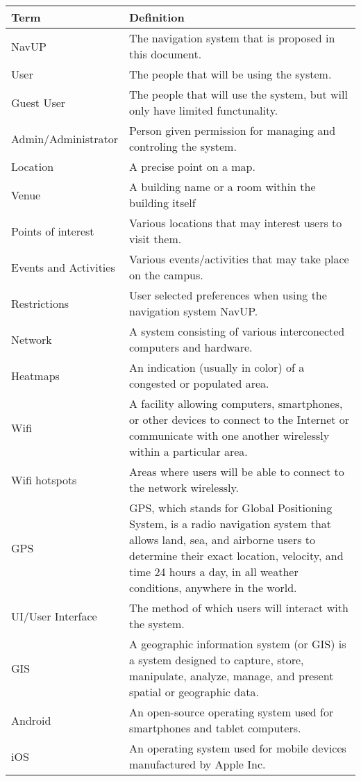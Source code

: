 \begin{center}
    \begin{tabular}{| l | p{8cm} |}
    \hline
    \textbf{Term} & \textbf{Definition} \\ \hline
	NavUP & The navigation system that is proposed in this document. \\ \hline
	User & The people that will be using the system. \\ \hline
	Guest User & The people that will use the system, but will only have limited functunality. \\ \hline
	Admin/Administrator & Person given permission for managing and controling the system. \\ \hline
	Location & A precise point on a map. \\ \hline
	Venue & A building name or a room within the building itself \\ \hline
	Points of interest & Various locations that may interest users to visit them. \\ \hline
	Events and Activities & Various events/activities that may take place on the campus. \\ \hline
	Restrictions & User selected preferences when using the navigation system NavUP. \\ \hline
	Network & A system consisting of various interconected computers and hardware. \\ \hline
	Heatmaps & An indication (usually in color) of a congested or populated area. \\ \hline
	Wifi & A facility allowing computers, smartphones, or other devices to connect to the Internet or communicate with one another wirelessly within a particular area. \\ \hline
	Wifi hotspots & Areas where users will be able to connect to the network wirelessly. \\ \hline    
	GPS & GPS, which stands for Global Positioning System, is a radio navigation system that allows land, sea, and airborne users to determine their exact location, velocity, and time 24 hours a day, in all weather conditions, anywhere in the world. \\ \hline
	UI/User Interface & The method of which users will interact with the system. \\ \hline
	GIS & A geographic information system (or GIS) is a system designed to capture, store, manipulate, analyze, manage, and present spatial or geographic data. \\ \hline
	Android & An open-source operating system used for smartphones and tablet computers. \\ \hline
	iOS & An operating system used for mobile devices manufactured by Apple Inc. \\ \hline
    \end{tabular}
\end{center}
